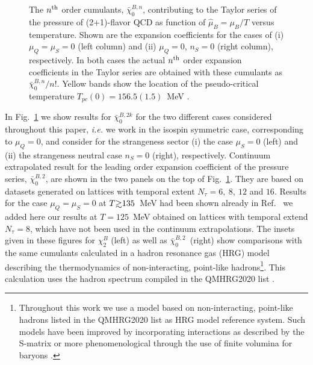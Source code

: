 \documentclass[pdflatex,prd,twocolumn,showpacs,superscriptaddress,nofootinbib]{revtex4-1}
\def\gsim{\raise0.3ex\hbox{$>$\kern-0.75em\raise-1.1ex\hbox{$\sim$}}}
\newcommand \hmu {\hat{\mu}}
\newcommand \cb {\bar{\chi}}
\begin{document}
\begin{figure}[ht]
\caption{The $n^{\rm th}$ order cumulants, $\cb_0^{B,n}$, contributing to the Taylor series of the pressure of
(2+1)-flavor QCD  as function of $\hmu_B=\mu_B/T$ versus temperature.
Shown are the expansion coefficients for the cases of (i) $\mu_Q=\mu_S=0$ (left column)
and (ii) $\mu_Q=0$, $n_S=0$ (right
column), respectively. In both cases the actual 
$n^{\rm th}$ order expansion coefficients in the Taylor series are obtained with these cumulants as $\cb_0^{B,n}/n!$. Yellow bands show the location of 
the pseudo-critical temperature $T_{pc}(0)=156.5(1.5)$~MeV \cite{HotQCD:2018pds}.
}
\label{fig:taylor8}
\end{figure}

In Fig.~\ref{fig:taylor8} we show results for $\cb_0^{B,2k}$ for the two different cases considered throughout this paper, {\it i.e.} we work in the isospin symmetric case, corresponding to $\mu_Q=0$, and 
consider for the strangeness sector (i) the case
$\mu_S=0$ (left) and (ii) the strangeness neutral case $n_S=0$ (right), respectively. Continuum extrapolated result for the leading order expansion coefficient of the pressure series, $\cb_{0}^{B,2}$, are shown in the two panels on the top of Fig.~\ref{fig:taylor8}. 
They are based on datasets generated on lattices with temporal extent $N_\tau=6,\ 8,\ 12$ and $16$.
Results for the case $\mu_Q=\mu_S=0$ at $T\gsim 135$~MeV had been shown already in Ref.~\cite{Bollweg:2021vqf}
we added here our results at $T=125$~MeV obtained on lattices with temporal extend
$N_\tau=8$, which have not been used in the 
continuum extrapolations. The insets given in these figures for $\chi_2^B$ (left) as well as  $\cb_0^{B,2}$~(right) show  comparisons with the same cumulants calculated in 
a hadron resonance gas (HRG) model
describing the thermodynamics of non-interacting, point-like hadrons\footnote{Throughout this work we use a model based on non-interacting, point-like hadrons listed in the QMHRG2020
list \cite{Bollweg:2021vqf} as HRG model reference system. Such models have been improved by incorporating interactions as described by the S-matrix \cite{Lo:2017ldt} or more phenomenological through the use of finite volumina for baryons \cite{Vovchenko:2016rkn}.}. 
This calculation uses the hadron spectrum compiled in the QMHRG2020 list \cite{Bollweg:2021vqf}. 
\end{document}

